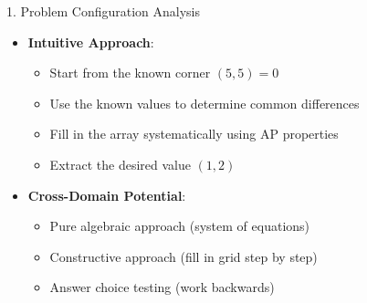\documentclass[12pt]{article}
\begin{document}
\begin{configbox}{1. Problem Configuration Analysis}
\begin{itemize}[leftmargin=*]
    \item \textbf{Intuitive Approach}: 
    \begin{itemize}
        \item Start from the known corner $(5,5) = 0$
        \item Use the known values to determine common differences
        \item Fill in the array systematically using AP properties
        \item Extract the desired value $(1,2)$
    \end{itemize}
    
    \item \textbf{Cross-Domain Potential}: 
    \begin{itemize}
        \item Pure algebraic approach (system of equations)
        \item Constructive approach (fill in grid step by step)
        \item Answer choice testing (work backwards)
    \end{itemize}
\end{itemize}

\end{configbox}
\end{document}
